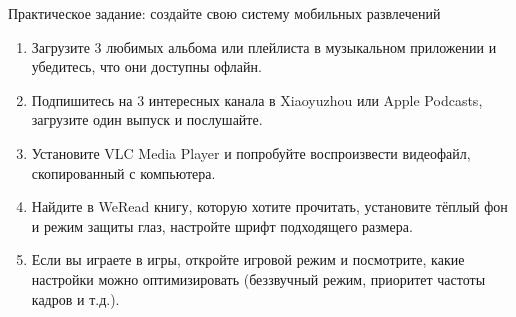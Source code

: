 \begin{tcbpractice}{Практическое задание: создайте свою систему мобильных развлечений}
\begin{enumerate}
  \item Загрузите 3 любимых альбома или плейлиста в музыкальном приложении и убедитесь, что они доступны офлайн.
  \item Подпишитесь на 3 интересных канала в Xiaoyuzhou или Apple Podcasts, загрузите один выпуск и послушайте.
  \item Установите VLC Media Player и попробуйте воспроизвести видеофайл, скопированный с компьютера.
  \item Найдите в WeRead книгу, которую хотите прочитать, установите тёплый фон и режим защиты глаз, настройте шрифт подходящего размера.
  \item Если вы играете в игры, откройте игровой режим и посмотрите, какие настройки можно оптимизировать (беззвучный режим, приоритет частоты кадров и т.д.).
\end{enumerate}

\end{tcbpractice}
